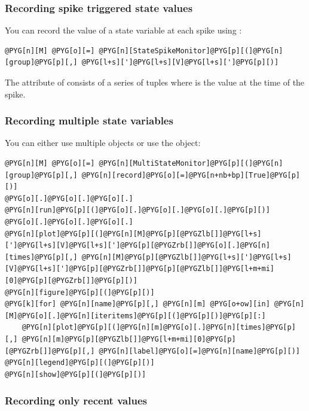 \documentclass[letterpaper,10pt,english]{manual}
\begin{document}
\subsubsection{Recording spike triggered state values}

You can record the value of a state variable at each spike using \hyperlink{brian.StateSpikeMonitor}{}:

\begin{Verbatim}[commandchars=@\[\]]
@PYG[n][M] @PYG[o][=] @PYG[n][StateSpikeMonitor]@PYG[p][(]@PYG[n][group]@PYG[p][,] @PYG[l+s][']@PYG[l+s][V]@PYG[l+s][']@PYG[p][)]
\end{Verbatim}

The  attribute of  consists of a series of tuples  where  is the
value at the time of the spike.


\subsubsection{Recording multiple state variables}

You can either use multiple \hyperlink{brian.StateMonitor}{} objects or use the \hyperlink{brian.MultiStateMonitor}{}
object:

\begin{Verbatim}[commandchars=@\[\]]
@PYG[n][M] @PYG[o][=] @PYG[n][MultiStateMonitor]@PYG[p][(]@PYG[n][group]@PYG[p][,] @PYG[n][record]@PYG[o][=]@PYG[n+nb+bp][True]@PYG[p][)]
@PYG[o][.]@PYG[o][.]@PYG[o][.]
@PYG[n][run]@PYG[p][(]@PYG[o][.]@PYG[o][.]@PYG[o][.]@PYG[p][)]
@PYG[o][.]@PYG[o][.]@PYG[o][.]
@PYG[n][plot]@PYG[p][(]@PYG[n][M]@PYG[p][@PYGZlb[]]@PYG[l+s][']@PYG[l+s][V]@PYG[l+s][']@PYG[p][@PYGZrb[]]@PYG[o][.]@PYG[n][times]@PYG[p][,] @PYG[n][M]@PYG[p][@PYGZlb[]]@PYG[l+s][']@PYG[l+s][V]@PYG[l+s][']@PYG[p][@PYGZrb[]]@PYG[p][@PYGZlb[]]@PYG[l+m+mi][0]@PYG[p][@PYGZrb[]]@PYG[p][)]
@PYG[n][figure]@PYG[p][(]@PYG[p][)]
@PYG[k][for] @PYG[n][name]@PYG[p][,] @PYG[n][m] @PYG[o+ow][in] @PYG[n][M]@PYG[o][.]@PYG[n][iteritems]@PYG[p][(]@PYG[p][)]@PYG[p][:]
    @PYG[n][plot]@PYG[p][(]@PYG[n][m]@PYG[o][.]@PYG[n][times]@PYG[p][,] @PYG[n][m]@PYG[p][@PYGZlb[]]@PYG[l+m+mi][0]@PYG[p][@PYGZrb[]]@PYG[p][,] @PYG[n][label]@PYG[o][=]@PYG[n][name]@PYG[p][)]
@PYG[n][legend]@PYG[p][(]@PYG[p][)]
@PYG[n][show]@PYG[p][(]@PYG[p][)]
\end{Verbatim}


\subsubsection{Recording only recent values}
\end{document}
